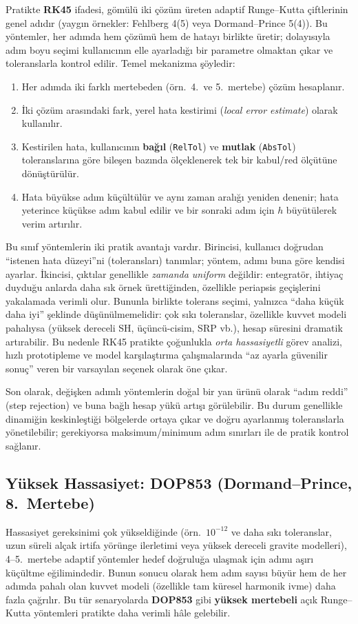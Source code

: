 Pratikte \textbf{RK45} ifadesi, gömülü iki çözüm üreten adaptif Runge--Kutta çiftlerinin genel adıdır
(yaygın örnekler: Fehlberg 4(5) veya Dormand--Prince 5(4)). Bu yöntemler, her adımda hem çözümü hem de hatayı birlikte
üretir; dolayısıyla adım boyu seçimi kullanıcının elle ayarladığı bir parametre olmaktan çıkar ve toleranslarla kontrol edilir.
Temel mekanizma şöyledir:
\begin{enumerate}
    \item Her adımda iki farklı mertebeden (örn.\ 4.\ ve 5.\ mertebe) çözüm hesaplanır.
    \item İki çözüm arasındaki fark, yerel hata kestirimi (\emph{local error estimate}) olarak kullanılır.
    \item Kestirilen hata, kullanıcının \textbf{bağıl} (\texttt{RelTol}) ve \textbf{mutlak} (\texttt{AbsTol}) toleranslarına göre
    bileşen bazında ölçeklenerek tek bir kabul/red ölçütüne dönüştürülür.
    \item Hata büyükse adım küçültülür ve aynı zaman aralığı yeniden denenir; hata yeterince küçükse adım kabul edilir ve
    bir sonraki adım için $h$ büyütülerek verim artırılır.
\end{enumerate}

\noindent
Bu sınıf yöntemlerin iki pratik avantajı vardır. Birincisi, kullanıcı doğrudan “istenen hata düzeyi”ni (toleransları) tanımlar;
yöntem, adımı buna göre kendisi ayarlar. İkincisi, çıktılar genellikle \emph{zamanda uniform} değildir: entegratör,
ihtiyaç duyduğu anlarda daha sık örnek ürettiğinden, özellikle periapsis geçişlerini yakalamada verimli olur.
Bununla birlikte tolerans seçimi, yalnızca “daha küçük daha iyi” şeklinde düşünülmemelidir: çok sıkı toleranslar,
özellikle kuvvet modeli pahalıysa (yüksek dereceli SH, üçüncü-cisim, SRP vb.), hesap süresini dramatik artırabilir.
Bu nedenle RK45 pratikte çoğunlukla \emph{orta hassasiyetli} görev analizi, hızlı prototipleme ve model karşılaştırma
çalışmalarında “az ayarla güvenilir sonuç” veren bir varsayılan seçenek olarak öne çıkar.

\noindent
Son olarak, değişken adımlı yöntemlerin doğal bir yan ürünü olarak “adım reddi” (step rejection) ve buna bağlı
hesap yükü artışı görülebilir. Bu durum genellikle dinamiğin keskinleştiği bölgelerde ortaya çıkar ve doğru ayarlanmış
toleranslarla yönetilebilir; gerekiyorsa maksimum/minimum adım sınırları ile de pratik kontrol sağlanır.


\subsection{Yüksek Hassasiyet: \texorpdfstring{DOP853}{DOP853} (Dormand--Prince, 8.\ Mertebe)}
Hassasiyet gereksinimi çok yükseldiğinde (örn.\ $10^{-12}$ ve daha sıkı toleranslar, uzun süreli alçak irtifa yörünge
ilerletimi veya yüksek dereceli gravite modelleri), 4--5.\ mertebe adaptif yöntemler hedef doğruluğa ulaşmak için
adımı aşırı küçültme eğilimindedir. Bunun sonucu olarak hem adım sayısı büyür hem de her adımda pahalı olan kuvvet modeli
(özellikle tam küresel harmonik ivme) daha fazla çağrılır. Bu tür senaryolarda \textbf{DOP853} gibi \textbf{yüksek mertebeli}
açık Runge--Kutta yöntemleri pratikte daha verimli hâle gelebilir.

